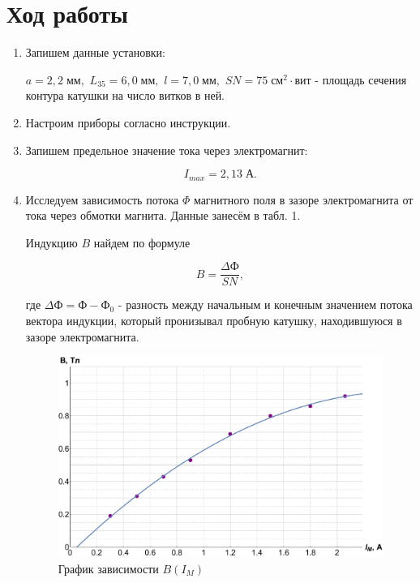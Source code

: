 \documentclass[12pt]{kiarticle} %
\begin{document}
  	\section{Ход работы}
  	
  	\begin{enumerate}
  	\item Запишем данные установки:
  	
  	$a=2,2 \; мм,$ $L_{35}=6,0 \;мм,$ $l=7,0 \;мм,$ $SN=75 \;см^{2}\cdot вит$ - площадь сечения контура катушки на число витков в ней.
  	
  	\item Настроим приборы согласно инструкции.
  	
  	\item Запишем предельное значение тока через электромагнит:
  	
  	$$ I_{max}=2,13 \; А.$$
  	
  	\item Исследуем зависимость потока $ \Phi $ магнитного поля в зазоре электромагнита от тока через обмотки магнита. Данные занесём в табл. 1.
  	
  	Индукцию $B$ найдем по формуле
  	
  \begin{equation}\label{}
  	B=\dfrac{\Delta Ф}{SN},
  \end{equation}
  	
  	где $\Delta Ф = Ф - Ф_{0}$ - разность между начальным и конечным значением потока вектора индукции, который пронизывал пробную катушку, находившуюся в зазоре электромагнита.
  	
  	
\begin{figure}[h!]
	\includegraphics[scale=0.5]{B.pdf}
	\caption{График зависимости $ B(I_M) $}
\end{figure}
  	

\end{enumerate}
\end{document}
